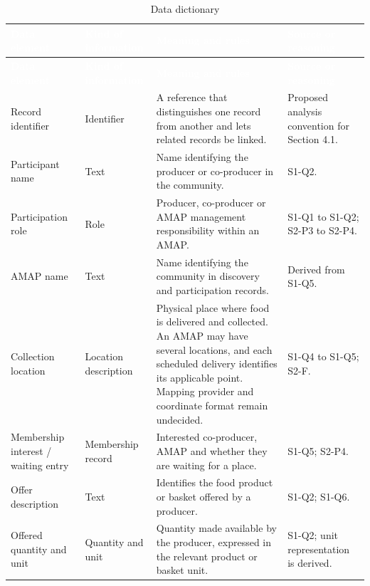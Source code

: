 \documentclass[11pt,a4paper]{article}
\begin{document}
{\footnotesize
\begin{longtable}{>{\raggedright\arraybackslash\hspace{0pt}}p{}>{\raggedright\arraybackslash\hspace{0pt}}p{}>{\raggedright\arraybackslash\hspace{0pt}}p{}>{\raggedright\arraybackslash\hspace{0pt}}p{}}
\caption{Data dictionary}\\
\rowcolor{hdr}\textcolor{white}{\textbf{Data element}} & \textcolor{white}{\textbf{Kind of information}} & \textcolor{white}{\textbf{Meaning and rules}} & \textcolor{white}{\textbf{Source or reasoning}} \\ \endfirsthead
\rowcolor{hdr}\textcolor{white}{\textbf{Data element}} & \textcolor{white}{\textbf{Kind of information}} & \textcolor{white}{\textbf{Meaning and rules}} & \textcolor{white}{\textbf{Source or reasoning}} \\ \endhead
Record identifier & Identifier & A reference that distinguishes one record from another and lets related records be linked. & Proposed analysis convention for Section 4.1. \\ \hline
Participant name & Text & Name identifying the producer or co-producer in the community. & S1-Q2. \\ \hline
Participation role & Role & Producer, co-producer or AMAP management responsibility within an AMAP. & S1-Q1 to S1-Q2; S2-P3 to S2-P4. \\ \hline
AMAP name & Text & Name identifying the community in discovery and participation records. & Derived from S1-Q5. \\ \hline
Collection location & Location description & Physical place where food is delivered and collected. An AMAP may have several locations, and each scheduled delivery identifies its applicable point. Mapping provider and coordinate format remain undecided. & S1-Q4 to S1-Q5; S2-F. \\ \hline
Membership interest / waiting entry & Membership record & Interested co-producer, AMAP and whether they are waiting for a place. & S1-Q5; S2-P4. \\ \hline
Offer description & Text & Identifies the food product or basket offered by a producer. & S1-Q2; S1-Q6. \\ \hline
Offered quantity and unit & Quantity and unit & Quantity made available by the producer, expressed in the relevant product or basket unit. & S1-Q2; unit representation is derived. \\ \hline

\end{longtable}}
\end{document}

